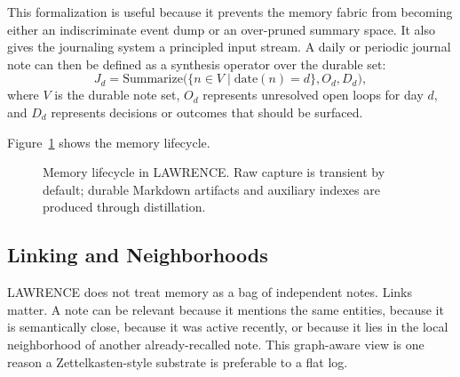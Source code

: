 \documentclass[conference]{IEEEtran}
\begin{document}
This formalization is useful because it prevents the memory fabric from becoming either an indiscriminate event dump or an over-pruned summary space. It also gives the journaling system a principled input stream. A daily or periodic journal note can then be defined as a synthesis operator over the durable set:
\begin{equation}
\label{eq:journal}
J_d = \mathrm{Summarize}\big(\{n \in V \mid \mathrm{date}(n)=d\}, O_d, D_d\big),
\end{equation}
where $V$ is the durable note set, $O_d$ represents unresolved open loops for day $d$, and $D_d$ represents decisions or outcomes that should be surfaced.

Figure~\ref{fig:memoryloop} shows the memory lifecycle.

\begin{figure}[t]
\centering
{}
\caption{Memory lifecycle in LAWRENCE. Raw capture is transient by default; durable Markdown artifacts and auxiliary indexes are produced through distillation.}
\label{fig:memoryloop}
\end{figure}

\subsection{Linking and Neighborhoods}
LAWRENCE does not treat memory as a bag of independent notes. Links matter. A note can be relevant because it mentions the same entities, because it is semantically close, because it was active recently, or because it lies in the local neighborhood of another already-recalled note. This graph-aware view is one reason a Zettelkasten-style substrate is preferable to a flat log.
\end{document}
